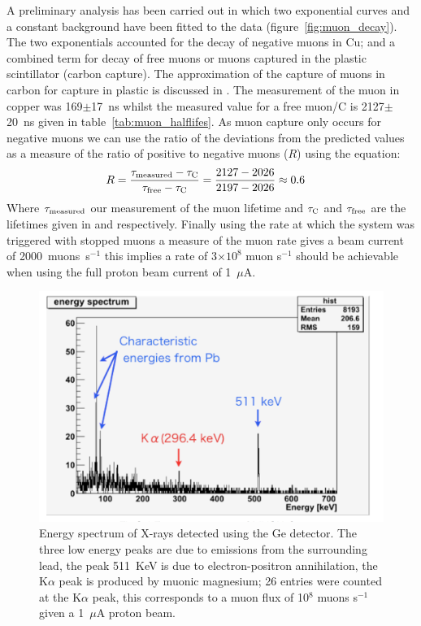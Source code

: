\documentclass[a4paper]{jpconf}
\begin{document}
A preliminary analysis has been carried out in which two exponential curves and a constant background have been fitted to the data (figure~\ref{fig:muon_decay}). The two exponentials accounted for the decay of negative muons in Cu; and a combined term for decay of free muons or muons captured in the plastic scintillator (carbon capture). The approximation of the capture of muons in carbon for capture in plastic is discussed in \cite{Suzuki1987muonCapture}. The measurement of the muon in copper was 169$\pm$17~ns whilst the measured value for a free muon/C is 2127$\pm$20~ns given in table~\ref{tab:muon_halflifes}. As muon capture only occurs for negative muons we can use the ratio of the deviations from the predicted values as a measure of the ratio of positive to negative muons ($R$) using the equation:
\begin{eqnarray}
    R &= \frac{\tau_{\rm{measured}} - \tau_{\rm{C}}}{\tau_{\rm{free}} - \tau_{\rm{C}} } = \frac{2127 - 2026}{2197-2026} \approx 0.6  \label{equ:ratio_pos_neg}
\end{eqnarray}
Where $\tau_{\rm{measured}}$ our measurement of the muon lifetime and $\tau_{\rm{C}}$ and $\tau_{\rm{free}}$ are the lifetimes given in \cite{Suzuki1987muonCapture} and \cite{Pdg2010} respectively. Finally using the rate at which the system was triggered with stopped muons a measure of the muon rate gives a beam current of 2000~muons~s$^{-1}$ this implies a rate of 3$\times 10^8$ muon s$^{-1}$ should be achievable when using the full proton beam current of 1~$\mu$A. 

\begin{figure}[htbp]
    \centering
        \includegraphics[height=7.5cm]{images/muonic_xray_spectrum.png}
    \caption{Energy spectrum of X-rays detected using the Ge detector. The three low energy peaks are due to emissions from the surrounding lead, the peak 511~KeV is due to electron-positron annihilation, the K$\alpha$ peak is produced by muonic magnesium; 26 entries were counted at the K$\alpha$ peak, this corresponds to a muon flux of 10$^8$ muons s$^{-1}$ given a 1~$\mu$A proton beam.}
    \label{fig:muonic_xray_spectrum}
\end{figure}
\end{document}
